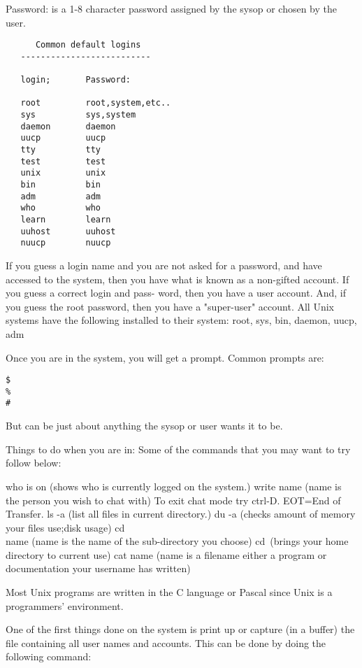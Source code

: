 \documentclass[a1paper]{article}
\begin{document}
\begin{multicols}{7}
{  Password:  is a 1-8 character password assigned by the sysop or chosen by the
user.

\begin{verbatim}
      Common default logins
   --------------------------

   login;       Password:

   root         root,system,etc..
   sys          sys,system
   daemon       daemon
   uucp         uucp
   tty          tty
   test         test
   unix         unix
   bin          bin
   adm          adm
   who          who
   learn        learn
   uuhost       uuhost
   nuucp        nuucp
\end{verbatim}

  If you guess a login name and you are not asked for a password, and have
accessed to the system, then you have what is known as a non-gifted account.  If
you guess a correct login and pass- word, then you have a user account.  And,
if you guess the root password, then you have a "super-user" account.  All Unix
systems have the following installed to their system:  root, sys, bin, daemon,
uucp, adm

  Once you are in the system, you will get a prompt.  Common prompts are:

\begin{verbatim}
$
%
#
\end{verbatim}


  But can be just about anything the sysop or user wants it to be.

  Things to do when you are in:  Some of the commands that you may want to try
follow below:

  who is on (shows who is currently logged on the system.)
  write name (name is the person you wish to chat with)
  To exit chat mode try ctrl-D.
  EOT=End of Transfer.
  ls -a (list all files in current directory.)
  du -a (checks amount of memory your files use;disk usage)
  cd\\name (name is the name of the sub-directory you choose)
  cd\ (brings your home directory to current use)
  cat name (name is a filename either a program or documentation your username
has written)

  Most Unix programs are written in the C language or Pascal since Unix is a
programmers' environment.

  One of the first things done on the system is print up or capture (in a
buffer) the file containing all user names and accounts.  This can be done by
doing the following command:


}
\end{multicols}
\end{document}
